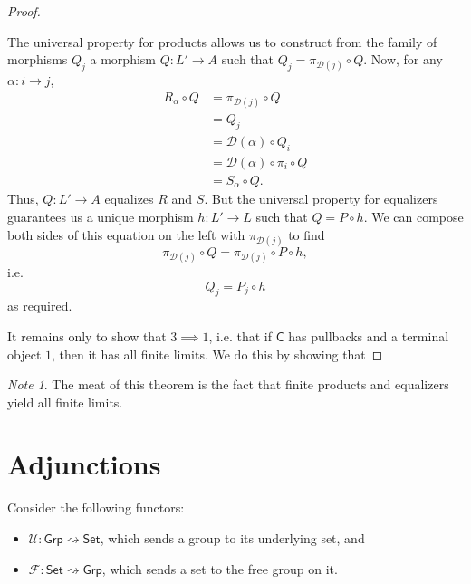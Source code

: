 \documentclass[a4paper]{report}
\theoremstyle{definition}
\theoremstyle{plain}
\theoremstyle{remark}
\newtheorem{note}{Note}[section]
\begin{document}
\begin{proof}
\begin{enumerate}
      The universal property for products allows us to construct from the family of morphisms $Q_{j}$ a morphism $Q\colon L' \to A$ such that $Q_{j} = \pi_{\mathcal{D}(j)} \circ Q$. Now, for any $\alpha\colon i \to j$,
      \begin{align*}
        R_{\alpha} \circ Q &= \pi_{\mathcal{D}(j)} \circ Q \\
        &= Q_{j} \\
        &= \mathcal{D}(\alpha) \circ Q_{i} \\
        &= \mathcal{D}(\alpha) \circ \pi_{i} \circ Q \\
        &= S_{\alpha} \circ Q.
      \end{align*}
      Thus, $Q\colon L' \to A$ equalizes $R$ and $S$. But the universal property for equalizers guarantees us a unique morphism $h\colon L' \to L$ such that $Q = P \circ h$. We can compose both sides of this equation on the left with $\pi_{\mathcal{D}(j)}$ to find
      \begin{equation*}
        \pi_{\mathcal{D}(j)} \circ Q = \pi_{\mathcal{D}(j)} \circ P \circ h,
      \end{equation*}
      i.e.
      \begin{equation*}
        Q_{j} = P_{j} \circ h
      \end{equation*}
      as required.
  \end{enumerate}

  It remains only to show that $3 \implies 1$, i.e. that if $\mathsf{C}$ has pullbacks and a terminal object $1$, then it has all finite limits. We do this by showing that 
\end{proof}

\begin{note}
  The meat of this theorem is the fact that finite products and equalizers yield all finite limits.
\end{note}

\section{Adjunctions} \label{sec:adjunctions}
Consider the following functors:
\begin{itemize}
  \item $\mathcal{U}\colon \mathsf{Grp} \rightsquigarrow \mathsf{Set}$, which sends a group to its underlying set, and

  \item $\mathcal{F}\colon \mathsf{Set} \rightsquigarrow \mathsf{Grp}$, which sends a set to the free group on it.
\end{itemize}
\end{document}
